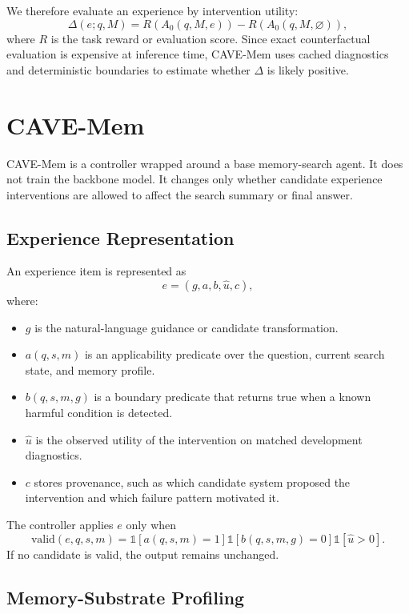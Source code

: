 \documentclass[11pt]{article}
\newcommand{\method}{CAVE-Mem}
\newcommand{\valid}{\mathrm{valid}}
\begin{document}
We therefore evaluate an experience by intervention utility:
\[
\Delta(e;q,M) =
R(A_0(q,M,e)) - R(A_0(q,M,\varnothing)),
\]
where $R$ is the task reward or evaluation score. Since exact counterfactual
evaluation is expensive at inference time, \method{} uses cached diagnostics
and deterministic boundaries to estimate whether $\Delta$ is likely positive.

\section{\method{}}

\method{} is a controller wrapped around a base memory-search agent. It does
not train the backbone model. It changes only whether candidate experience
interventions are allowed to affect the search summary or final answer.

\subsection{Experience Representation}

An experience item is represented as
\[
e = (g, a, b, \hat{u}, c),
\]
where:

\begin{itemize}[leftmargin=*]
  \item $g$ is the natural-language guidance or candidate transformation.
  \item $a(q,s,m)$ is an applicability predicate over the question, current
  search state, and memory profile.
  \item $b(q,s,m,g)$ is a boundary predicate that returns true when a known
  harmful condition is detected.
  \item $\hat{u}$ is the observed utility of the intervention on matched
  development diagnostics.
  \item $c$ stores provenance, such as which candidate system proposed the
  intervention and which failure pattern motivated it.
\end{itemize}

The controller applies $e$ only when
\[
\valid(e,q,s,m) =
\mathbb{1}[a(q,s,m)=1]
\mathbb{1}[b(q,s,m,g)=0]
\mathbb{1}[\hat{u}>0].
\]
If no candidate is valid, the output remains unchanged.

\subsection{Memory-Substrate Profiling}
\end{document}
